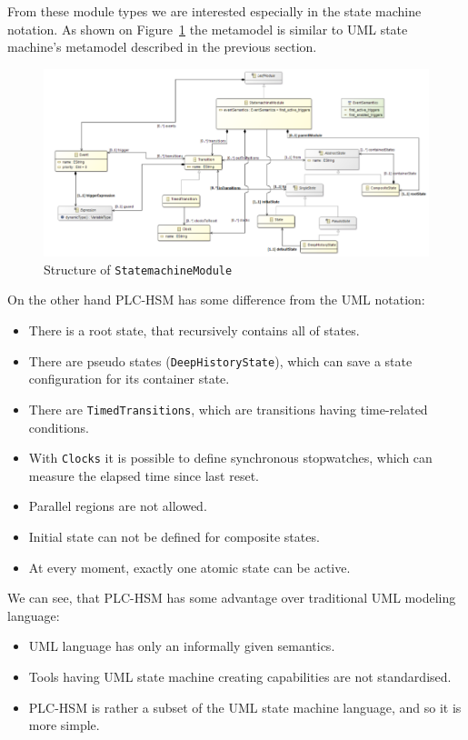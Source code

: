 From these module types we are interested especially in the state machine notation. As shown on Figure~\ref{fig:plchsm_statemachine} the metamodel is similar to UML state machine's metamodel described in the previous section.

\begin{figure}[htp]
\centering
\includegraphics[scale=0.5]{figures/plchsm_statemachine}
\caption{Structure of \texttt{StatemachineModule}}
\label{fig:plchsm_statemachine}
\end{figure}

On the other hand PLC-HSM has some difference from the UML notation:

\begin{itemize}
	\item There is a root state, that recursively contains all of states.
	\item There are pseudo states (\texttt{DeepHistoryState}), which can save a state configuration for its container state.
	\item There are \texttt{TimedTransitions}, which are transitions having time-related conditions.
	\item With \texttt{Clocks} it is possible to define synchronous stopwatches, which can measure the elapsed time since last reset.
	\item Parallel regions are not allowed.
	\item Initial state can not be defined for composite states.
	\item At every moment, exactly one atomic state can be active. 
\end{itemize}


We can see, that PLC-HSM has some advantage over traditional UML modeling language:

\begin{itemize}
	\item UML language has only an informally given semantics.
	\item Tools having UML state machine creating capabilities are not standardised.
	\item PLC-HSM is rather a subset of the UML state machine language, and so it is more simple.
\end{itemize}

